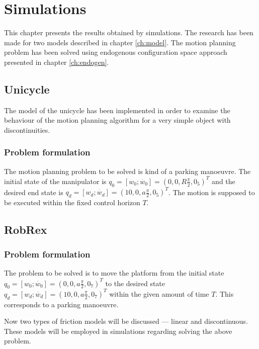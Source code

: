\chapter{Simulations}
This chapter presents the results obtained by simulations. The research has been made for two models
described in chapter \ref{ch:model}. The motion planning problem has been solved using endogenous
configuration space approach presented in chapter \ref{ch:endogen}.

\section{Unicycle}
The model of the unicycle has been implemented in order to examine the behaviour
of the motion planning algorithm for a very simple object with discontinuities. 

\subsection{Problem formulation}
The motion planning problem to be solved is kind of a parking manoeuvre. The initial
state of the manipulator is $q_0 = [w_0; \dot{w_0}] = (0, 0, R\frac{\pi}{2}, 0_5)^T$
and the desired end state is $q_d = [w_d; \dot{w_d}] = (10, 0, a\frac{\pi}{2}, 0_5)^T$.
The motion is supposed to be executed within the fixed control horizon $T$.

\section{RobRex}
\subsection{Problem formulation}
\label{sec:rex_task}
The problem to be solved is to move the platform from the initial state
$q_0 = [w_0; \dot{w_0}] = (0, 0, a\frac{\pi}{2}, 0_7)^T$ to the desired state
$q_d = [w_d; \dot{w_d}] = (10, 0, a\frac{\pi}{2}, 0_7)^T$
within the given amount of time $T$. 
This corresponds to a parking manoeuvre.

Now two types of friction models will be discussed --- linear
and discontinuous. These models will be employed in simulations
regarding solving the above problem.


